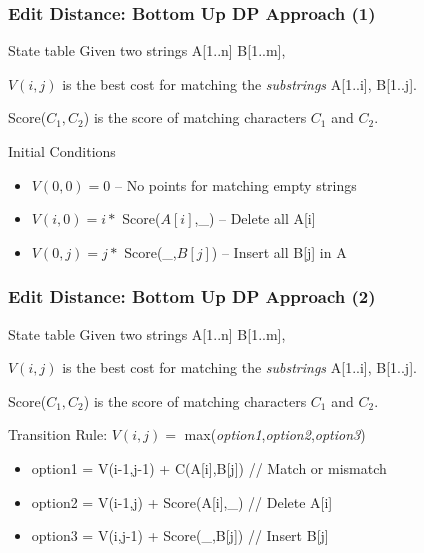 \documentclass{beamer}
\begin{document}
\begin{frame}
  \frametitle{Edit Distance: Bottom Up DP Approach (1)}
  {\smaller
    \begin{block}{State table}
      Given two strings A[1..n] B[1..m],
      \smallskip

      $V(i,j)$ is the best cost for matching the \emph{substrings} A[1..i], B[1..j].
      \smallskip

      Score($C_1,C_2$) is the score of matching characters $C_1$ and $C_2$.
    \end{block}
    \begin{exampleblock}{Initial Conditions}
      \begin{itemize}
      \item $V(0,0) = 0$ -- No points for matching empty strings
      \item $V(i,0) = i*$ Score($A[i]$,\_) -- Delete all A[i]  
      \item $V(0,j) = j*$ Score(\_,$B[j]$) -- Insert all B[j] in A
      \end{itemize}
    \end{exampleblock}
  }
\end{frame}

\begin{frame}
  \frametitle{Edit Distance: Bottom Up DP Approach (2)}
  {\smaller
    \begin{block}{State table}
      Given two strings A[1..n] B[1..m],
      \smallskip

      $V(i,j)$ is the best cost for matching the \emph{substrings} A[1..i], B[1..j].
      \smallskip

      Score($C_1,C_2$) is the score of matching characters $C_1$ and $C_2$.
    \end{block}
    \begin{exampleblock}{Transition Rule:}
      $V(i,j) = $ max(\emph{option1},\emph{option2},\emph{option3})
      \begin{itemize}
      \item option1 = V(i-1,j-1) + C(A[i],B[j]) // Match or mismatch
      \item option2 = V(i-1,j) + Score(A[i],\_) // Delete A[i]
      \item option3 = V(i,j-1) + Score(\_,B[j]) // Insert B[j]
      \end{itemize}
    \end{exampleblock}


  }
\end{frame}
\end{document}
